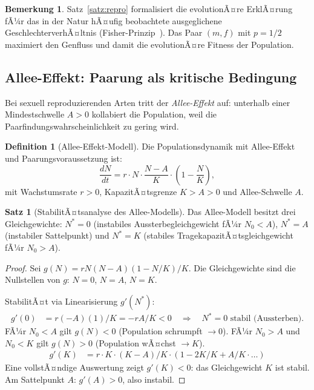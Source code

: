 ﻿\documentclass[a4paper,12pt]{article}
\theoremstyle{definition}
\newtheorem{definition}{Definition}
\newtheorem{satz}{Satz}
\newtheorem{bemerkung}{Bemerkung}
\begin{document}
\begin{bemerkung}
	Satz~\ref{satz:repro} formalisiert die evolutionÃ¤re ErklÃ¤rung fÃ¼r das in der
	Natur hÃ¤ufig beobachtete ausgeglichene GeschlechterverhÃ¤ltnis (Fisher-Prinzip~\cite{mayr1963}).
	Das Paar $(m, f)$ mit $p = 1/2$ maximiert den Genfluss und damit die
	evolutionÃ¤re Fitness der Population.
\end{bemerkung}

\subsection{Allee-Effekt: Paarung als kritische Bedingung}

Bei sexuell reproduzierenden Arten tritt der \emph{Allee-Effekt} auf: unterhalb einer
Mindestschwelle $A > 0$ kollabiert die Population, weil die Paarfindungswahrscheinlichkeit
zu gering wird.

\begin{definition}[Allee-Effekt-Modell]
	Die Populationsdynamik mit Allee-Effekt und Paarungsvoraussetzung ist:
	\[
		\frac{dN}{dt} = r \cdot N \cdot \frac{N - A}{K} \cdot \left(1 - \frac{N}{K}\right),
	\]
	mit Wachstumsrate $r > 0$, KapazitÃ¤tsgrenze $K > A > 0$ und Allee-Schwelle $A$.
\end{definition}

\begin{satz}[StabilitÃ¤tsanalyse des Allee-Modells]
	Das Allee-Modell besitzt drei Gleichgewichte:
	$N^* = 0$ (instabiles Aussterbegleichgewicht fÃ¼r $N_0 < A$),
	$N^* = A$ (instabiler Sattelpunkt) und
	$N^* = K$ (stabiles TragekapazitÃ¤tsgleichgewicht fÃ¼r $N_0 > A$).
\end{satz}

\begin{proof}
	Sei $g(N) = r N (N-A)(1 - N/K)/K$. Die Gleichgewichte sind die Nullstellen von $g$:
	$N = 0$, $N = A$, $N = K$.
	
	StabilitÃ¤t via Linearisierung $g'(N^*)$:
	\begin{align*}
		g'(0) &= r(-A)(1) / K = -rA/K < 0 \quad\Rightarrow\quad N^*=0 \text{ stabil (Aussterben).}
	\end{align*}
	FÃ¼r $N_0 < A$ gilt $g(N) < 0$ (Population schrumpft $\to 0$).
	FÃ¼r $N_0 > A$ und $N_0 < K$ gilt $g(N) > 0$ (Population wÃ¤chst $\to K$).
	\begin{align*}
		g'(K) &= r \cdot K \cdot (K-A)/K \cdot (1 - 2K/K + A/K \cdot \ldots)
	\end{align*}
	Eine vollstÃ¤ndige Auswertung zeigt $g'(K) < 0$: das Gleichgewicht $K$ ist stabil.
	Am Sattelpunkt $A$: $g'(A) > 0$, also instabil. \qedhere
\end{proof}
\end{document}
